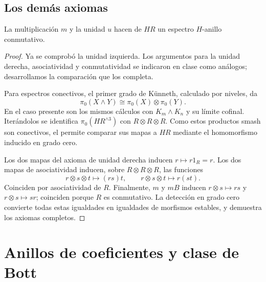\subsection{Los demás axiomas}
\begin{prop}\label{prop:c25-hr-anillo}
La multiplicación $m$ y la unidad $u$ hacen de $HR$ un espectro $H$-anillo conmutativo.
\end{prop}
\begin{proof}
Ya se comprobó la unidad izquierda. Los argumentos para la unidad derecha, asociatividad y conmutatividad se indicaron en clase como análogos; desarrollamos la comparación que los completa.

Para espectros conectivos, el primer grado de Künneth, calculado por niveles, da
\[
\pi_0(X\wedge Y)\cong\pi_0(X)\otimes\pi_0(Y).
\]
En el caso presente son los mismos cálculos con $K_m\wedge K_n$ y su límite cofinal. Iterándolos se identifica $\pi_0(HR^{\wedge3})$ con $R\otimes R\otimes R$. Como estos productos smash son conectivos, el  permite comparar sus mapas a $HR$ mediante el homomorfismo inducido en grado cero.

Los dos mapas del axioma de unidad derecha inducen $r\mapsto r1_R=r$. Los dos mapas de asociatividad inducen, sobre $R\otimes R\otimes R$, las funciones
\[
r\otimes s\otimes t\longmapsto(rs)t,
\qquad r\otimes s\otimes t\longmapsto r(st).
\]
Coinciden por asociatividad de $R$. Finalmente, $m$ y $mB$ inducen $r\otimes s\mapsto rs$ y $r\otimes s\mapsto sr$; coinciden porque $R$ es conmutativo. La detección en grado cero convierte todas estas igualdades en igualdades de morfismos estables, y demuestra los axiomas completos.
\end{proof}

\section{Anillos de coeficientes y clase de Bott}

